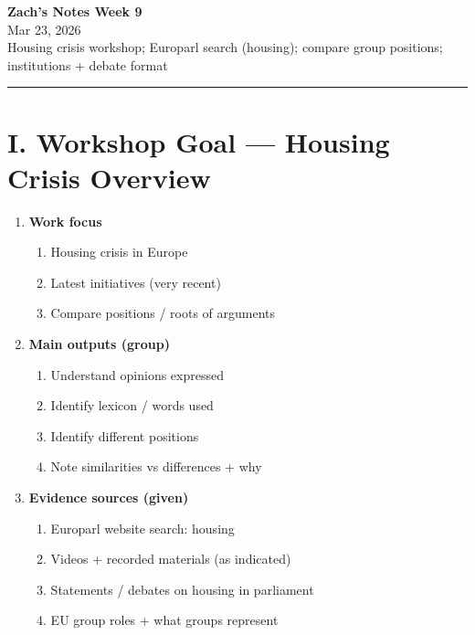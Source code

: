 \documentclass[10pt,a4paper]{article}
\begin{document}
\begin{center}
{\large\bfseries\color{eublue} Zach's Notes Week 9}\\[0.2em]
\footnotesize Mar 23, 2026\\
Housing crisis workshop; Europarl search (housing); compare group positions; institutions + debate format
\end{center}
\vspace{0.5em}

\noindent\rule{\linewidth}{0.4pt}\vspace{0.5em}

\section*{I. Workshop Goal --- Housing Crisis Overview}
\begin{enumerate}[label=\Alph*.]
\item \textbf{Work focus}
  \begin{enumerate}[label=\arabic*.]
  \item Housing crisis in Europe
  \item Latest initiatives (very recent)
  \item Compare positions / roots of arguments
  \end{enumerate}
\item \textbf{Main outputs (group)}
  \begin{enumerate}[label=\arabic*.]
  \item Understand opinions expressed
  \item Identify lexicon / words used
  \item Identify different positions
  \item Note similarities vs differences + why
  \end{enumerate}
\item \textbf{Evidence sources (given)}
  \begin{enumerate}[label=\arabic*.]
  \item Europarl website search: housing
  \item Videos + recorded materials (as indicated)
  \item Statements / debates on housing in parliament
  \item EU group roles + what groups represent
  \end{enumerate}
\end{enumerate}
\end{document}
